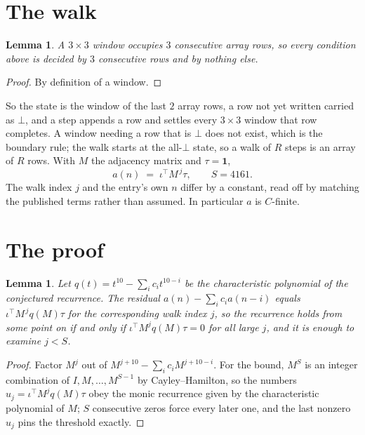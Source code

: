 \documentclass[11pt,a4paper]{article}
\theoremstyle{plain}
\newtheorem{lemma}[theorem]{Lemma}
\theoremstyle{definition}
\begin{document}
\section{The walk}

\begin{lemma}\label{lem:win}
A $3\times3$ window occupies $3$ consecutive array rows, so every condition above is
decided by $3$ consecutive rows and by nothing else.
\end{lemma}

\begin{proof}
By definition of a window.
\end{proof}

So the state is the window of the last $2$ array rows, a row not yet written carried as
$\bot$, and a step appends a row and settles every $3\times3$ window that row completes. A
window needing a row that is $\bot$ does not exist, which is the boundary rule; the walk starts
at the all-$\bot$ state, so a walk of $R$ steps is an array of $R$ rows. With $M$ the adjacency
matrix and $\tau=\mathbf{1}$,
\[
a(n)\;=\;\iota^{\!\top}M^{\,j}\tau ,\qquad S=4161.
\]
The walk index $j$ and the entry's own $n$ differ by a constant, read off by matching the
published terms rather than assumed. In particular $a$ is $C$-finite.

\section{The proof}

\begin{lemma}\label{lem:crit}
Let $q(t)=t^{10}-\sum_i c_it^{10-i}$ be the characteristic polynomial of the
conjectured recurrence. The residual $a(n)-\sum_ic_ia(n-i)$ equals
$\iota^{\!\top}M^{\,j}q(M)\tau$ for the corresponding walk index $j$, so the recurrence
holds from some point on if and only if $\iota^{\!\top}M^{j}q(M)\tau=0$ for all large $j$,
and it is enough to examine $j<S$.
\end{lemma}

\begin{proof}
Factor $M^{j}$ out of $M^{j+10}-\sum_ic_iM^{j+10-i}$. For the bound, $M^{S}$
is an integer combination of $I,M,\dots,M^{S-1}$ by Cayley--Hamilton, so the numbers
$u_j=\iota^{\!\top}M^{j}q(M)\tau$ obey the monic recurrence given by the characteristic
polynomial of $M$; $S$ consecutive zeros force every later one, and the last nonzero $u_j$
pins the threshold exactly.
\end{proof}
\end{document}
